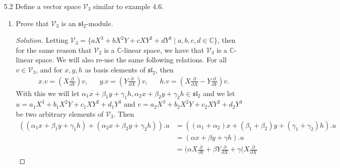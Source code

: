 \documentclass[12pt]{article}
\theoremstyle{definition}
\newenvironment{solution}
{\renewcommand\qedsymbol{$\blacksquare$}\begin{proof}[Solution]}
{\end{proof}}
\begin{document}
\begin{enumerate}
\begin{enumerate}
\begin{solution}
\begin{equation*}
                        \end{equation*}
                    \end{solution}
            \end{enumerate}
        \item[5.2] Define a vector space $\mathcal{V}_3$ similar to example
            4.6.
            \begin{enumerate}
                \item Prove that $\mathcal{V}_3$ is an
                    $\mathfrak{sl}_2$-module.
                    \begin{solution}
                        Letting $\mathcal{V}_3=\{aX^3+bX^2Y+cXY^2+dY^3\mid a, b,
                        c, d\in\mathbb{C}\}$, then for the same reason that
                        $\mathcal{V}_2$ is a $\mathbb{C}$-linear space, we have
                        that $\mathcal{V}_3$ is a $\mathbb{C}$-linear space. We
                        will also re-use the same following relations. For all
                        $v\in\mathcal{V}_3$, and for $x, y, h$ as basis elements of
                        $\mathfrak{sl}_2$, then 
                        \begin{align*}
                            &x.v = (X\frac{\partial}{\partial Y})v,&
                            &y.v = (Y\frac{\partial}{\partial X})v,&
                            &h.v = (X\frac{\partial}{\partial X}
                            - Y\frac{\partial}{\partial Y})v.
                        \end{align*}
                        With this we will let $\alpha_1x+\beta_1y+\gamma_1h,
                        \alpha_2x+\beta_2y+\gamma_2h\in\mathfrak{sl}_2$ and we let
                        $u=a_1X^3+b_1X^2Y+c_1XY^2+d_1Y^3$ and
                        $v=a_2X^3+b_2X^2Y+c_2XY^2+d_2Y^3$ be two arbitrary elements
                        of $\mathcal{V}_3$. Then
                        \begin{equation*}
                            \begin{split}
                                ((\alpha_1x+\beta_1y+\gamma_1h)+(\alpha_2x+\beta_2y+\gamma_2h)).u
                                &=((\alpha_1+\alpha_2)x+(\beta_1+\beta_2)y+(\gamma_1+\gamma_2)h).u
                                \\ 
                                &=(\alpha x+\beta y+\gamma h).u \\
                                &=(\alpha X\frac{\partial}{\partial
                                Y}+\beta Y\frac{\partial}{\partial X}+\gamma(X\frac{\partial}{\partial X}

\end{split}
\end{equation*}
\end{solution}
\end{enumerate}
\end{enumerate}
\end{document}
